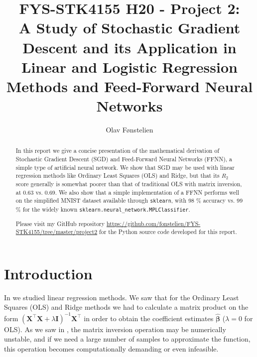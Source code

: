 \documentclass[]{article}
\title{FYS-STK4155 H20 - Project 2:\\A Study of Stochastic Gradient Descent and its Application in Linear and Logistic Regression Methods and Feed-Forward Neural Networks}
\author{Olav Fønstelien}
\begin{document}
\maketitle

\begin{abstract}

In this report we give a concise presentation of the mathematical derivation of Stochastic Gradient Descent (SGD) and Feed-Forward Neural Networks (FFNN), a simple type of artificial neural network. We show that SGD may be used with linear regression methods like Ordinary Least Squares (OLS) and Ridge, but that its $R_2$ score generally is somewhat poorer than that of traditional OLS with matrix inversion, at 0.63 vs. 0.69. We also show that a simple implementation of a FFNN performs well on the simplified MNIST dataset available through \lstinline|sklearn|, with 98 \% accuracy vs. 99 \% for the widely known \lstinline|sklearn.neural_network.MPLClassifier|.

Please visit my GitHub repository \url{https://github.com/fonstelien/FYS-STK4155/tree/master/project2} for the Python source code developed for this report.

\end{abstract}

\section{Introduction} \label{intro}

In \cite{project1} we studied linear regression methods. We saw that for the Ordinary Least Squares (OLS) and Ridge methods we had to calculate a matrix product on the form $(\mathbf{X}^\intercal \mathbf{X} + \lambda \mathbf{I})^{-1} \mathbf{X}^\intercal$ in order to obtain the coefficient estimates $\mathbf{\hat{\beta}}$ ($\lambda = 0$ for OLS). As we saw in \cite{project1}, the matrix inversion operation may be numerically unstable, and if we need a large number of samples to approximate the function, this operation becomes computationally demanding or even infeasible. 
\end{document}
